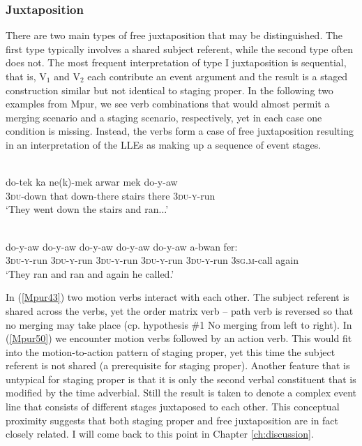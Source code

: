 \subsubsection{Juxtaposition}
\label{sec:juxtaposition}

There are two main types of free juxtaposition that may be distinguished. The first type typically involves a shared subject referent, while the second type often does not. The most frequent interpretation of type I juxtaposition is sequential, that is, V$_1$ and V$_2$ each contribute an event argument and the result is a staged construction similar but not identical to staging proper. In the following two examples from Mpur, we see verb combinations that would almost permit a merging scenario and a staging scenario, respectively, yet in each case one condition is missing. Instead, the verbs form a case of free juxtaposition resulting in an interpretation of the LLEs as making up a sequence of event stages.

\ea \label{Mpur43} 
\\
\gll do-tek ka ne(k)-mek arwar mek do-y-aw \\
3\textsc{du}-down that down-there stairs there 3\textsc{du}-\textsc{y}-run \\
\glft `They went down the stairs and ran...' \\ 
\z

\xe
\ea \label{Mpur50}
\\
\gll do-y-aw do-y-aw do-y-aw do-y-aw do-y-aw a-bwan fer: \\
3\textsc{du}-\textsc{y}-run 3\textsc{du}-\textsc{y}-run 3\textsc{du}-\textsc{y}-run 3\textsc{du}-\textsc{y}-run 3\textsc{du}-\textsc{y}-run 3\textsc{sg}.\textsc{m}-call again \\
\glft `They ran and ran and again he called.' \\ 
\z

In (\ref{Mpur43}) two motion verbs interact with each other. The subject referent is shared across the verbs, yet the order matrix verb -- path verb is reversed so that no merging may take place (cp. hypothesis \#1 No merging from left to right). In (\ref{Mpur50}) we encounter motion verbs followed by an action verb. This would fit into the motion-to-action pattern of staging proper, yet this time the subject referent is not shared (a prerequisite for staging proper). Another feature that is untypical for staging proper is that it is only the second verbal constituent that is modified by the time adverbial. Still the result is taken to denote a complex event line that consists of different stages juxtaposed to each other. This conceptual proximity suggests that both staging proper and free juxtaposition are in fact closely related. I will come back to this point in Chapter \ref{ch:discussion}.

